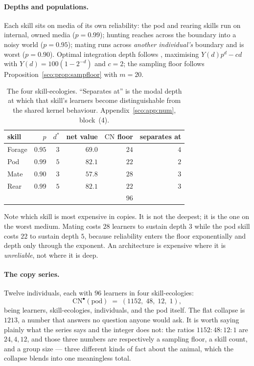 \documentclass[11pt]{article}
\theoremstyle{plain}
\theoremstyle{definition}
\theoremstyle{remark}
\newcommand{\CN}{\mathrm{CN}}
\begin{document}
\paragraph{Depths and populations.}
Each skill sits on media of its own reliability: the pod and rearing
skills run on internal, owned media ($p = 0.99$); hunting reaches across
the boundary into a noisy world ($p=0.95$); mating runs across
\emph{another individual's} boundary and is worst ($p = 0.90$). Optimal
integration depth follows \cite[\S5.5]{engine}, maximising
$Y(d)p^d - cd$ with $Y(d) = 100(1-2^{-d})$ and $c=2$; the sampling floor
follows Proposition~\ref{sco:prop:sampfloor} with $m=20$.

\begin{table}[h]
\centering
\begin{tabular}{lrrrrr}
\toprule
skill & $p$ & $d^\ast$ & net value & $\CN$ floor & separates at \\
\midrule
Forage & $0.95$ & $3$ & $69.0$ & $24$ & $4$ \\
Pod    & $0.99$ & $5$ & $82.1$ & $22$ & $2$ \\
Mate   & $0.90$ & $3$ & $57.8$ & $28$ & $3$ \\
Rear   & $0.99$ & $5$ & $82.1$ & $22$ & $3$ \\
\midrule
       &        &     &        & $96$ & \\
\bottomrule
\end{tabular}
\caption{The four skill-ecologies. ``Separates at'' is the modal depth at
which that skill's learners become distinguishable from the shared kernel
behaviour. Appendix~\ref{sco:app:num}, block~(4).}
\label{sco:tab:skills}
\end{table}

Note which skill is most expensive in copies. It is not the deepest; it is
the one on the worst medium. Mating costs $28$ learners to sustain depth
$3$ while the pod skill costs $22$ to sustain depth $5$, because
reliability enters the floor exponentially and depth only through the
exponent. An architecture is expensive where it is \emph{unreliable},
not where it is deep.

\paragraph{The copy series.}
Twelve individuals, each with $96$ learners in four skill-ecologies:
\[
  \CN^{\bullet}(\text{pod}) \;=\; (1152,\; 48,\; 12,\; 1),
\]
being learners, skill-ecologies, individuals, and the pod itself. The flat
collapse is $1213$, a number that answers no question anyone would ask. It
is worth saying plainly what the series says and the integer does not: the
ratios $1152{:}48{:}12{:}1$ are $24, 4, 12$, and those three numbers are
respectively a sampling floor, a skill count, and a group size --- three
different kinds of fact about the animal, which the collapse blends into
one meaningless total.
\end{document}
